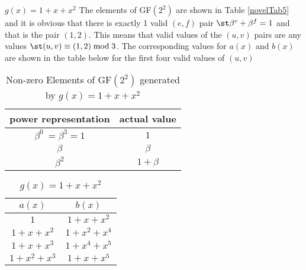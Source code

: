 \begin{example}
$g(x)=1+x+x^2$ \newline
The elements of GF$(2^2)$ are shown in Table \ref{novelTab5} and it is obvious that there is exactly 1 valid $(e,f)$ pair $\st \beta^e+\beta^f = 1$ and that is the pair $(1,2)$.
This means that valid values of the $(u,v)$ pairs are any values $\st (u,v) \equiv (1,2) \bmod 3$.  The corresponding values for $a(x)$ and $b(x)$ are shown in the table below for the first four valid values of $(u,v)$

 \begin{table*}[h]
 \caption{Non-zero Elements of GF$(2^2)$ generated by $g(x)=1+x+x^2$}
\centering
 \begin{tabular}{c c} 
 \hline
 power representation & actual value \\ [0.5ex] 
 \hline\hline
$\beta^0~=\beta^3=1$ & $1$\\
\hline
$\beta$ & $\beta$\\
\hline
$\beta^2$ &  $1+\beta$\\
 \end{tabular}
 \label{novelTab7}
\end{table*}

\begin{table*}[h]
 \caption{$g(x)=1+x+x^2$}
\centering
 \begin{tabular}{c c} 
 \hline
 $a(x)$ & $b(x)$\\ [0.5ex] 
 \hline\hline
$1$ & $1+x+x^2$\\ 
\hline
$1+x+x^2$ &  $1+x^2+x^4$\\
\hline
$1+x+x^3$ & $1+x^4+x^5$\\
\hline
$1+x^2+x^3$ & $1+x+x^5$ 
 \end{tabular}
 \label{novelTab8}
\end{table*}
\end{example}

